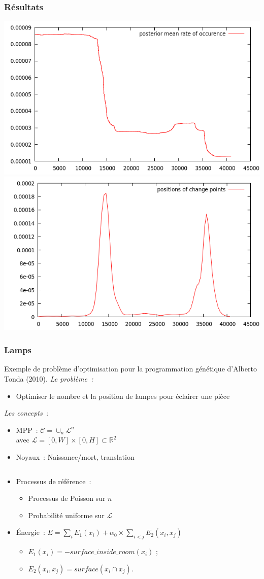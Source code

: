\documentclass{beamer}
\begin{document}
\begin{frame}
\frametitle{Résultats}
\includegraphics[width = 0.5\linewidth]{posterior_mean_rate}\\
\includegraphics[width = 0.5\linewidth]{positions_change_points}
\end{frame}

\begin{frame}
\frametitle{Lamps}
Exemple de problème d'optimisation pour la programmation génétique d'Alberto Tonda (2010).
\emph{Le probl\`eme~:} 
\begin{itemize}
\item Optimiser le nombre et la position de lampes pour éclairer une pièce
\end{itemize}
\emph{Les concepts~:}
\begin{itemize}
\item MPP~:  $\mathcal{C} = \cup_{n}\mathcal{L}^n$\\
avec $\mathcal{L}=[0,W]\times[0,H] \subset  \mathds{R}^{2}$
\item Noyaux~: Naissance/mort, translation
\end{itemize}

\begin{columns}
\begin{column}{0.55\textwidth}
\begin{itemize}
\item Processus de référence~:
\begin{itemize}
\item Processus de Poisson sur $n$
\item Probabilité uniforme sur $\mathcal{L}$
\end{itemize}
\item \'Energie~: $E = \sum_i E_1(x_i) + \alpha_{0} \times \sum_{i<j} E_2(x_i,x_j)$
\begin{itemize}
\item $E_1(x_i) = -surface\_inside\_room(x_i)$ ;
\item $E_2(x_i,x_j) = surface(x_i \cap x_j)$.
\end{itemize}
\end{itemize}
\end{column}
\begin{column}{0.45\textwidth}
\end{column}
\end{columns}
\end{frame}
\end{document}
